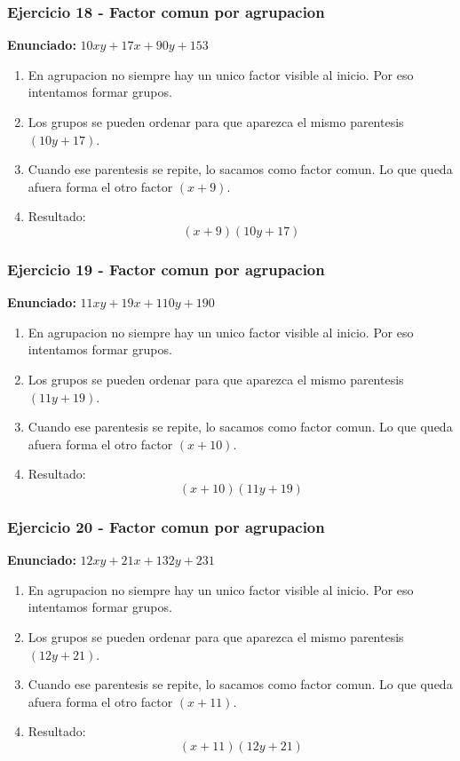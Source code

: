 \documentclass[11pt,a4paper]{article}
\begin{document}
\vspace{0.2cm}
\subsubsection*{Ejercicio 18 - Factor comun por agrupacion}
\textbf{Enunciado:} $ 10 x y + 17 x + 90 y + 153 $\par
\begin{enumerate}[leftmargin=2em]
\item En agrupacion no siempre hay un unico factor visible al inicio. Por eso intentamos formar grupos.
\item Los grupos se pueden ordenar para que aparezca el mismo parentesis \((10 y + 17)\).
\item Cuando ese parentesis se repite, lo sacamos como factor comun. Lo que queda afuera forma el otro factor \((x + 9)\).
\item Resultado: \[\boxed{\left(x + 9\right)\left(10 y + 17\right)}\]
\end{enumerate}

\vspace{0.2cm}
\subsubsection*{Ejercicio 19 - Factor comun por agrupacion}
\textbf{Enunciado:} $ 11 x y + 19 x + 110 y + 190 $\par
\begin{enumerate}[leftmargin=2em]
\item En agrupacion no siempre hay un unico factor visible al inicio. Por eso intentamos formar grupos.
\item Los grupos se pueden ordenar para que aparezca el mismo parentesis \((11 y + 19)\).
\item Cuando ese parentesis se repite, lo sacamos como factor comun. Lo que queda afuera forma el otro factor \((x + 10)\).
\item Resultado: \[\boxed{\left(x + 10\right)\left(11 y + 19\right)}\]
\end{enumerate}

\vspace{0.2cm}
\subsubsection*{Ejercicio 20 - Factor comun por agrupacion}
\textbf{Enunciado:} $ 12 x y + 21 x + 132 y + 231 $\par
\begin{enumerate}[leftmargin=2em]
\item En agrupacion no siempre hay un unico factor visible al inicio. Por eso intentamos formar grupos.
\item Los grupos se pueden ordenar para que aparezca el mismo parentesis \((12 y + 21)\).
\item Cuando ese parentesis se repite, lo sacamos como factor comun. Lo que queda afuera forma el otro factor \((x + 11)\).
\item Resultado: \[\boxed{\left(x + 11\right)\left(12 y + 21\right)}\]
\end{enumerate}
\end{document}
